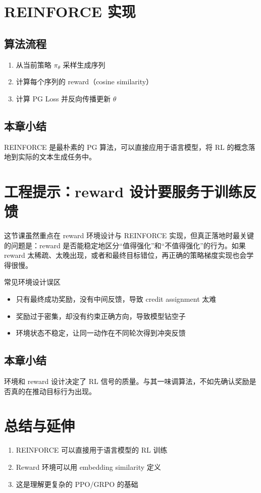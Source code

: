 \documentclass[a4paper]{article}
\begin{document}
\section{REINFORCE 实现}
\subsection{算法流程}
\begin{enumerate}
  \item 从当前策略 $\pi_\theta$ 采样生成序列
  \item 计算每个序列的 reward（cosine similarity）
  \item 计算 PG Loss 并反向传播更新 $\theta$
\end{enumerate}

\subsection{本章小结}
REINFORCE 是最朴素的 PG 算法，可以直接应用于语言模型，将 RL 的概念落地到实际的文本生成任务中。

\section{工程提示：reward 设计要服务于训练反馈}
这节课虽然重点在 reward 环境设计与 REINFORCE 实现，但真正落地时最关键的问题是：reward 是否能稳定地区分“值得强化”和“不值得强化”的行为。如果 reward 太稀疏、太晚出现，或者和最终目标错位，再正确的策略梯度实现也会学得很慢。

\begin{warningbox}{常见环境设计误区}
\begin{itemize}
  \item 只有最终成功奖励，没有中间反馈，导致 credit assignment 太难
  \item 奖励过于密集，却没有约束正确方向，导致模型钻空子
  \item 环境状态不稳定，让同一动作在不同轮次得到冲突反馈
\end{itemize}
\end{warningbox}

\subsection{本章小结}
环境和 reward 设计决定了 RL 信号的质量。与其一味调算法，不如先确认奖励是否真的在推动目标行为出现。

\newpage
\section{总结与延伸}
\begin{enumerate}
  \item REINFORCE 可以直接用于语言模型的 RL 训练
  \item Reward 环境可以用 embedding similarity 定义
  \item 这是理解更复杂的 PPO/GRPO 的基础
\end{enumerate}
\end{document}
